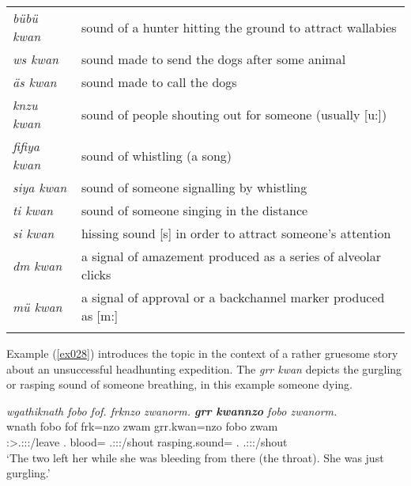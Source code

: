 {\begin{table}[p]
\begin{tabularx}{\textwidth}{Xl}
		\tablevspace
		\multicolumn{2}{l}{{human made signal sounds}}\\ \midrule
		\emph{bübü kwan}&sound of a hunter hitting the ground to attract wallabies\\
		\emph{ws kwan}&sound made to send the dogs after some animal\\
		\emph{äs kwan}&sound made to call the dogs\\
		\emph{knzu kwan}&sound of people shouting out for someone (usually [u:])\\
		\emph{fifiya kwan}&sound of whistling (a song)\\
		\emph{siya kwan}&sound of someone signalling by whistling\\
		\emph{ti kwan}&sound of someone singing in the distance\\
		\emph{si kwan}&hissing sound [s] in order to attract someone's attention\\
		\emph{dm kwan}&a signal of amazement produced as a series of alveolar clicks\\
		\emph{mü kwan}&a signal of approval or a backchannel marker produced as [m:]\\
		\lspbottomrule
	\end{tabularx}
\end{table}}%

Example (\ref{ex028}) introduces the topic in the context of a rather gruesome story about an unsuccessful headhunting expedition. The  \emph{grr kwan} depicts the gurgling or rasping sound of someone breathing, in this example someone dying.

\begin{exe}
	\ex \emph{wgathiknath fobo fof. frknzo zwanorm. \textbf{grr kwannzo} fobo zwanorm.}\\
	\gll wnath fobo fof frk=nzo zwam grr.kwan=nzo fobo zwam\\
	\Stdu:\Sbj>\Tsg.\F:\Obj:\Pst:\Ipfv/leave {\Dist}.{\All} {\Emph} blood={\Only} \Tsg.\F:\Sbj:\Pst:\Dur/shout rasping.sound={\Only} {\Dist}.{\All} \Tsg.\F:\Sbj:\Pst:\Dur/shout\\
	\trans `The two left her while she was bleeding from there (the throat). She was just gurgling.' 
	\label{ex028}
\end{exe}

